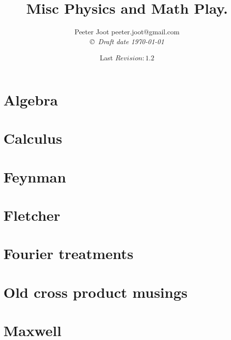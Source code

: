 \documentclass[12pt,leqno]{book}
\date{ Last $Revision: 1.2 $ }
\begin{document}

\title{Misc Physics and Math Play.}
\author{Peeter Joot  \quad peeter.joot@gmail.com \\
{\small\em \copyright \  Draft date \today }}

\maketitle

\clearpage{}
\tableofcontents

\clearpage{}

\pagestyle{plain}




\part{Algebra}





\part{Calculus}







\part{Feynman}


\part{Fletcher}


\part{Fourier treatments}


\part{Old cross product musings}



\part{Maxwell}


\end{document}
